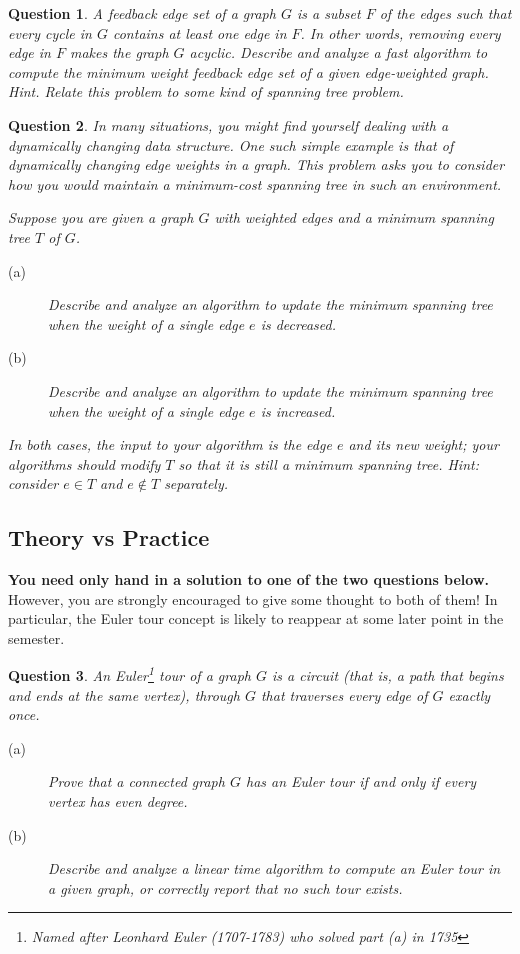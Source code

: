 \documentclass[10pt]{article}
\newtheorem{question}{Question}
\begin{document}
\begin{question} \label{q:fes}
A {\em feedback edge set} of a graph $G$ is a subset $F$ of the edges such that every cycle in $G$ contains at least one edge in $F$. In other words, removing every edge in $F$ makes the graph $G$ acyclic.   Describe and analyze a fast algorithm to compute the minimum weight feedback edge set of  a given edge-weighted graph.  Hint.  Relate this problem to some kind of spanning tree problem.
\end{question}

\begin{question}
In many situations, you might find yourself dealing with a dynamically changing data structure.  One such simple example is that of
dynamically changing edge weights in a graph.  This problem asks you to consider how you would maintain a minimum-cost spanning tree in
such an environment.

Suppose you are given a graph $G$ with weighted edges and a minimum spanning tree $T$ of $G$. 
\begin{description}
 	\item [(a)] Describe and analyze an algorithm to update the minimum spanning tree when the weight of a single edge $e$ is decreased.
	\item [(b)] Describe and analyze an  algorithm to update the minimum spanning tree when the weight of a single edge $e$ is increased.
\end{description}
In both cases, the input to your algorithm is the edge $e$ and its new weight; your algorithms should modify $T$ so that it is still a minimum spanning tree.  {\em Hint:  consider $e \in T$ and $e \not\in T$ separately}.
\end{question}

\subsection*{Theory vs Practice}

\textbf{You need only hand in a solution to one of the two questions below.}  However, you are strongly encouraged to give some thought to both of them! In particular, the Euler tour concept is likely to reappear at some later point in the semester.

\begin{question}
An Euler\footnote{Named after Leonhard Euler (1707-1783) who solved part (a) in 1735}
 tour of a graph $G$ is a circuit (that is, a path that begins and ends at the same vertex), through $G$ that traverses every edge of $G$ exactly once. 
\begin{description}
	\item [(a)] Prove that a connected graph $G$ has an Euler tour if and only if every vertex has even degree. 
	\item [(b)] Describe and analyze a linear time algorithm to compute an Euler tour in a given graph, or correctly 
report that no such tour exists. 
\end{description}
\end{question}
\end{document}

